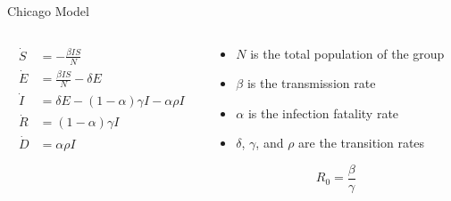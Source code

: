 \begin{slide}{Chicago Model}
\begin{columns}[T]
	\begin{column}{.15\textwidth}
		\begin{align*}
			\dot{S}	&=	- \frac{\beta I S}{N}\\
			\dot{E}	&=	\frac{\beta I S}{N} - \delta E \\
			\dot{I}	&=	\delta E - (1 - \alpha) \gamma I - \alpha \rho I \\
			\dot{R}	&=	(1 - \alpha) \gamma I \\
			\dot{D}	&=	\alpha \rho I
		\end{align*}
		\vfill
	\end{column}
	\begin{column}{.5\textwidth}
		\vfill
		\begin{itemize}
			\item $N$ is the total population of the group
			\item $\beta$ is the transmission rate
			\item $\alpha$ is the infection fatality rate
			\item $\delta$, $\gamma$, and $\rho$ are the transition rates
		\end{itemize}
		\begin{definition}
			$$R_0 = \frac{\beta}{\gamma}$$
		\end{definition}
		\vfill
	\end{column}
\end{columns}

\vfill
 
\end{slide}
